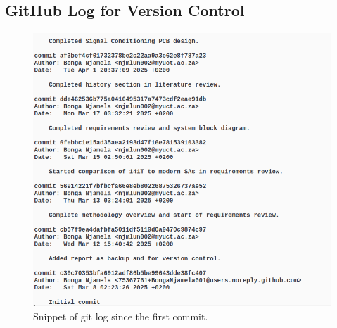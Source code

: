 \documentclass[class=report,11pt,crop=false]{standalone}
\begin{document}
	\subsection{GitHub Log for Version Control}
	\begin{figure}[ht!]
		\centering
		\includegraphics[width=0.80\linewidth]{Figures/Appendices/gitlog}
		\caption{Snippet of git log since the first commit.}
		\label{fig:github-qr}
	\end{figure} 
	\ifstandalone
	
	\printnoidxglossary[type=\acronymtype,nonumberlist]
	\fi
\end{document}
